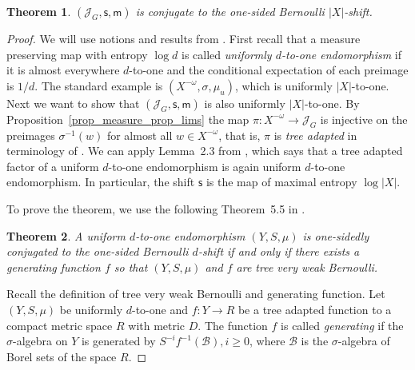 \documentclass[12pt]{article}
\newcommand{\xmo}{X^{-\omega}}
\newcommand{\lims}[1][G]{\mathscr{J}_{#1}}
\newcommand{\si}{\mathsf{s}}
\newcommand{\muls}{\mathsf{m}}
\newtheorem{theor}{Theorem}
\theoremstyle{definition}
\begin{document}
\begin{theor}\label{theor_lims_conju_Bernoulli}
$(\lims,\si,\muls)$ is conjugate to the one-sided Bernoulli $|X|$-shift.
\end{theor}
\begin{proof}
We will use notions and results from \cite{hoffman:Bernoulli}. First recall that a measure
preserving map with entropy $\log{d}$ is called {\it uniformly $d$-to-one endomorphism} if it is
almost everywhere $d$-to-one and the conditional expectation of each preimage is $1/d$.  The
standard example is $(\xmo,\sigma,\mu_u)$, which is uniformly $|X|$-to-one. Next we want to show
that $(\lims,\si,\muls)$ is also uniformly $|X|$-to-one. By
Proposition~\ref{prop_measure_prop_lims} the map $\pi:\xmo\rightarrow\lims$ is injective on the
preimages $\sigma^{-1}(w)$ for almost all $w\in\xmo$, that is, $\pi$ is {\it tree adapted} in
terminology of \cite{hoffman:Bernoulli}. We can apply Lemma~2.3 from \cite{hoffman:Bernoulli},
which says that a tree adapted factor of a uniform $d$-to-one endomorphism is again uniform
$d$-to-one endomorphism. In particular, the shift $\si$ is the map of maximal entropy $\log |X|$.

To prove the theorem, we use the following Theorem~5.5 in \cite{hoffman:Bernoulli}.

\begin{theor}
A uniform $d$-to-one endomorphism $(Y,S,\mu)$ is one-sidedly conjugated to the one-sided Bernoulli
$d$-shift if and only if there exists a generating function $f$ so that $(Y,S,\mu)$ and $f$ are
tree very weak Bernoulli.
\end{theor}


Recall the definition of tree very weak Bernoulli and generating function. Let $(Y,S,\mu)$ be
uniformly $d$-to-one and $f:Y\rightarrow{R}$ be a tree adapted function to a compact metric space
$R$ with metric $D$. The function $f$ is called \textit{generating} if the $\sigma$-algebra on $Y$
is generated by $S^{-i}f^{-1}(\mathcal{B}),i\geq{0}$, where $\mathcal{B}$ is the $\sigma$-algebra
of Borel sets of the space $R$.


\end{proof}
\end{document}
